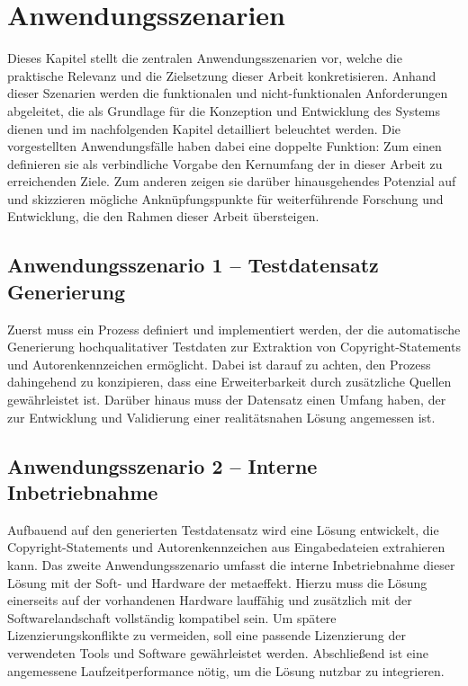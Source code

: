 \chapter{Anwendungsszenarien}\label{ch:anwendungsszenarien}

Dieses Kapitel stellt die zentralen Anwendungsszenarien vor, welche die praktische Relevanz und die Zielsetzung dieser Arbeit konkretisieren.
Anhand dieser Szenarien werden die funktionalen und nicht-funktionalen Anforderungen abgeleitet, die als Grundlage für die Konzeption und Entwicklung des Systems dienen und im nachfolgenden Kapitel  detailliert beleuchtet werden.
Die vorgestellten Anwendungsfälle haben dabei eine doppelte Funktion: Zum einen definieren sie als verbindliche Vorgabe den Kernumfang der in dieser Arbeit zu erreichenden Ziele.
Zum anderen zeigen sie darüber hinausgehendes Potenzial auf und skizzieren mögliche Anknüpfungspunkte für weiterführende Forschung und Entwicklung, die den Rahmen dieser Arbeit übersteigen.

\section{Anwendungsszenario 1 -- Testdatensatz Generierung}\label{sec:anwendungsszenario-1}

Zuerst muss ein Prozess definiert und implementiert werden, der die automatische Generierung hochqualitativer Testdaten zur Extraktion von Copyright-Statements und Autorenkennzeichen ermöglicht.
Dabei ist darauf zu achten, den Prozess dahingehend zu konzipieren, dass eine Erweiterbarkeit durch zusätzliche Quellen gewährleistet ist.
Darüber hinaus muss der Datensatz einen Umfang haben, der zur Entwicklung und Validierung einer realitätsnahen Lösung angemessen ist.

\section{Anwendungsszenario 2 -- Interne Inbetriebnahme}\label{sec:anwendungsszenario-2}

Aufbauend auf den generierten Testdatensatz wird eine Lösung entwickelt, die Copyright-Statements und Autorenkennzeichen aus Eingabedateien extrahieren kann.
Das zweite Anwendungsszenario umfasst die interne Inbetriebnahme dieser Lösung mit der Soft- und Hardware der metaeffekt.
Hierzu muss die Lösung einerseits auf der vorhandenen Hardware lauffähig und zusätzlich mit der Softwarelandschaft vollständig kompatibel sein.
Um spätere Lizenzierungskonflikte zu vermeiden, soll eine passende Lizenzierung der verwendeten Tools und Software gewährleistet werden.
Abschließend ist eine angemessene Laufzeitperformance nötig, um die Lösung nutzbar zu integrieren.

